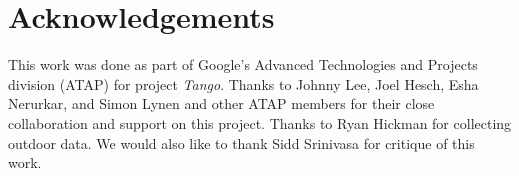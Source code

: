 \section*{Acknowledgements}
This work was done as part of Google's Advanced Technologies and Projects
division (ATAP) for project \emph{Tango}. Thanks to Johnny Lee, Joel Hesch, Esha
Nerurkar, and Simon Lynen and other ATAP members for their close collaboration
and support on this project. Thanks to Ryan Hickman for collecting outdoor data.
We would also like to thank Sidd Srinivasa for critique of this work.


 
